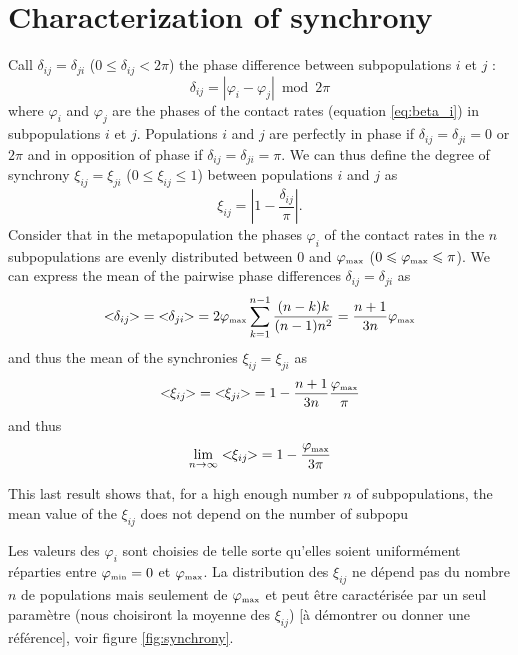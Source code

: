 \documentclass[a4paper,10pt]{article}
\begin{document}
\section{Characterization of synchrony}

Call $\delta_{ij} =\delta_{ji}$ ($0\leqslant \delta_{ij} < 2\pi$) the phase difference between subpopulations $i$ et $j$ :
\begin{equation}
  \delta_{ij} = |\varphi_i-\varphi_j| \bmod 2\pi
\end{equation}
where $\varphi_i$ and $\varphi_j$ are the phases of the contact rates (equation \ref{eq:beta_i}) in subpopulations $i$ et $j$. Populations $i$ and $j$ are perfectly in phase if $\delta_{ij} =\delta_{ji} = 0$ or $2\pi$ and in opposition of phase if $\delta_{ij} =\delta_{ji} = \pi$. We can thus define the degree of synchrony $\xi_{ij} =\xi_{ji}$ ($0\leqslant \xi_{ij} \leqslant 1$) between populations $i$ and $j$ as
\begin{equation}
  \xi_{ij} = \left|1 - \frac{\delta_{ij}}{\pi}\right|.
\end{equation}
Consider that in the metapopulation the phases $\varphi_i$ of the contact rates in the $n$ subpopulations are evenly distributed between 0 and $\varphi_{\mbox{\tiny max}}$ ($0\leqslant\varphi_{\mbox{\tiny max}}\leqslant\pi$). We can express the mean of the pairwise phase differences $\delta_{ij} =\delta_{ji}$ as
\begin{equation}
  <\!\!\delta_{ij}\!\!>\; =\; <\!\!\delta_{ji}\!\!>\; = 2\varphi_{\mbox{\tiny max}}\sum_{k=1}^{n-1}\frac{(n-k)k}{(n-1)n^2} = \frac{n+1}{3n}\varphi_{\mbox{\tiny max}}
\end{equation}
and thus the mean of the synchronies $\xi_{ij} =\xi_{ji}$ as
\begin{equation}
  <\!\!\xi_{ij}\!\!>\; =\; <\!\!\xi_{ji}\!\!>\; = 1-\frac{n+1}{3n}\frac{\varphi_{\mbox{\tiny max}}}{\pi}
\end{equation}
and thus
\begin{equation}
  \lim_{n \to \infty} <\!\!\xi_{ij}\!\!>\; = 1-\frac{\varphi_{\mbox{\tiny max}}}{3\pi}
\end{equation}

This last result shows that, for a high enough number $n$ of subpopulations, the mean value of the $\xi_{ij}$ does not depend on the number of subpopu

Les valeurs des $\varphi_i$ sont choisies de telle sorte qu'elles soient uniformément réparties entre $\varphi_{\mbox{\tiny min}}=0$ et $\varphi_{\mbox{\tiny max}}$. La distribution des $\xi_{ij}$ ne dépend pas du nombre $n$ de populations mais seulement de $\varphi_{\mbox{\tiny max}}$ et peut être caractérisée par un seul paramètre (nous choisiront la moyenne des $\xi_{ij}$) [à démontrer ou donner une référence], voir figure \ref{fig:synchrony}.
\end{document}
